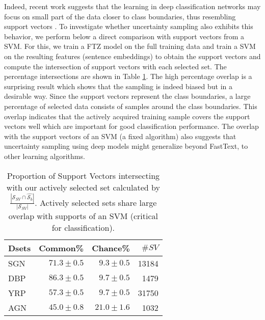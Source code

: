 \documentclass[11pt,a4paper]{article}
\begin{document}
Indeed, recent work suggests that the learning in deep classification networks may focus on small part of the data closer to class boundaries, thus resembling support vectors \cite{xu2018convergence, toneva19example}. To investigate whether uncertainty sampling also exhibits this behavior, we perform below a direct comparison with support vectors from a SVM. For this, we train a FTZ model on the full training data and train a SVM on the resulting features (sentence embeddings) to obtain the support vectors and compute the intersection of support vectors with each selected set. The percentage intersections are shown in Table \ref{tab:support}. The high percentage overlap is a surprising result which shows that the sampling is indeed biased but in a desirable way. Since the support vectors represent the class boundaries, a large percentage of selected data consists of samples around the class boundaries. This overlap indicates that the actively acquired training sample covers the support vectors well which are important for good classification performance. The overlap with the support vectors of an SVM (a fixed algorithm) also suggests that uncertainty sampling using deep models might generalize beyond FastText, to other learning algorithms. 
\begin{table}[t]
\small\addtolength{\tabcolsep}{-3pt}
\centering
  \begin{tabular}{|l|r|r|r|}
  \hline
  Dsets & Common\% & Chance\% & $\#SV$  \\ \hline
  SGN & $71.3 \pm 0.5$ & $9.3 \pm 0.5$ & 13184  \\ \hline 
  DBP & $86.3 \pm 0.5$ & $9.7 \pm 0.5$ & 1479   \\ \hline
  YRP & $57.3 \pm 0.5$ & $9.7 \pm 0.5$ & 31750    \\\hline
  AGN  & $45.0 \pm 0.8$ & $21.0 \pm 1.6$ & 1032  \\ \hline 
  \end{tabular}
\caption{Proportion of Support Vectors intersecting with our actively selected set calculated by $\frac{|\mathcal{S}_{SV}\cap \hat{\mathcal{S}_b}|}{|\mathcal{S}_{SV}|}$. Actively selected sets share large overlap with supports of an SVM (critical for classification).} 
\label{tab:support}
\vspace{-0.8cm}
\end{table}
\end{document}
